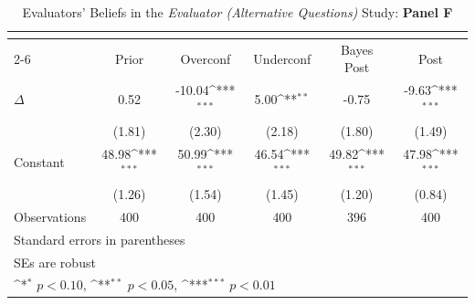 \begin{table}[htbp]\centering
\def\sym#1{\ifmmode^{#1}\else\(^{#1}\)\fi}
\caption{Evaluators' Beliefs in the \textit{Evaluator (Alternative Questions)} Study: \textbf{Panel F}}
\begin{tabular}{l*{5}{c}}
\hline\hline
                &\multicolumn{5}{c}{}                                                                          \\\cmidrule(lr){2-6}
                &\multicolumn{1}{c}{Prior}&\multicolumn{1}{c}{Overconf}&\multicolumn{1}{c}{Underconf}&\multicolumn{1}{c}{Bayes Post}&\multicolumn{1}{c}{Post}\\
\hline
$\Delta$        &     0.52         &   -10.04\sym{***}&     5.00\sym{**} &    -0.75         &    -9.63\sym{***}\\
                &   (1.81)         &   (2.30)         &   (2.18)         &   (1.80)         &   (1.49)         \\
Constant        &    48.98\sym{***}&    50.99\sym{***}&    46.54\sym{***}&    49.82\sym{***}&    47.98\sym{***}\\
                &   (1.26)         &   (1.54)         &   (1.45)         &   (1.20)         &   (0.84)         \\
\hline
Observations    &      400         &      400         &      400         &      396         &      400         \\
\hline\hline
\multicolumn{6}{l}{\footnotesize Standard errors in parentheses}\\
\multicolumn{6}{l}{\footnotesize SEs are robust}\\
\multicolumn{6}{l}{\footnotesize \sym{*} \(p<0.10\), \sym{**} \(p<0.05\), \sym{***} \(p<0.01\)}\\
\end{tabular}
\end{table}
